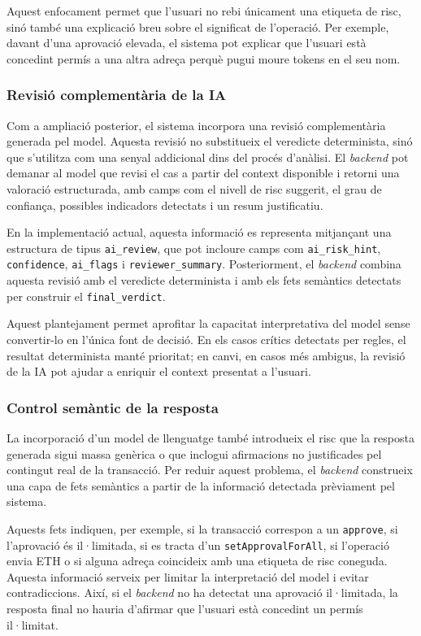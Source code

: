 Aquest enfocament permet que l’usuari no rebi únicament una etiqueta de risc, sinó també una explicació breu sobre el significat de l’operació. Per exemple, davant d’una aprovació elevada, el sistema pot explicar que l’usuari està concedint permís a una altra adreça perquè pugui moure tokens en el seu nom.

\subsubsection{Revisió complementària de la IA}

Com a ampliació posterior, el sistema incorpora una revisió complementària generada pel model. Aquesta revisió no substitueix el veredicte determinista, sinó que s’utilitza com una senyal addicional dins del procés d’anàlisi. El \textit{backend} pot demanar al model que revisi el cas a partir del context disponible i retorni una valoració estructurada, amb camps com el nivell de risc suggerit, el grau de confiança, possibles indicadors detectats i un resum justificatiu.

En la implementació actual, aquesta informació es representa mitjançant una estructura de tipus \texttt{ai\_review}, que pot incloure camps com \texttt{ai\_risk\_hint}, \texttt{confidence}, \texttt{ai\_flags} i \texttt{reviewer\_summary}. Posteriorment, el \textit{backend} combina aquesta revisió amb el veredicte determinista i amb els fets semàntics detectats per construir el \texttt{final\_verdict}.

Aquest plantejament permet aprofitar la capacitat interpretativa del model sense convertir-lo en l’única font de decisió. En els casos crítics detectats per regles, el resultat determinista manté prioritat; en canvi, en casos més ambigus, la revisió de la IA pot ajudar a enriquir el context presentat a l’usuari.

\subsubsection{Control semàntic de la resposta}

La incorporació d’un model de llenguatge també introdueix el risc que la resposta generada sigui massa genèrica o que inclogui afirmacions no justificades pel contingut real de la transacció. Per reduir aquest problema, el \textit{backend} construeix una capa de fets semàntics a partir de la informació detectada prèviament pel sistema.

Aquests fets indiquen, per exemple, si la transacció correspon a un \texttt{approve}, si l’aprovació és il·limitada, si es tracta d’un \texttt{setApprovalForAll}, si l’operació envia ETH o si alguna adreça coincideix amb una etiqueta de risc coneguda. Aquesta informació serveix per limitar la interpretació del model i evitar contradiccions. Així, si el \textit{backend} no ha detectat una aprovació il·limitada, la resposta final no hauria d’afirmar que l’usuari està concedint un permís il·limitat.

